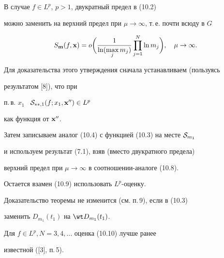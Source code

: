 \begin{note}


В случае $f\in L^p$, $p>1$, двукратный предел в (10.2)


можно заменить на верхний предел при $\mu\to\infty$, т.\,е. почти всюду в $G$


\begin{equation}


S_{{\bold m}}(f, {\bold x})=o\bigg(\frac{1}{\ln(\max\limits_j m_j)}


\prod_{j=1}^N \ln m_j\bigg),\quad \mu\to\infty.


\end{equation}


\end{note}





Для доказательства этого утверждения сначала устанавливаем (пользуясь


результатом [8]), что при


п.\,в. $x_1$ \ ${\cal S}_{**,1}(f;x_1,{\bold x}'')\in L^p$


как функция от ${\bold x}''$.


Затем записываем аналог (10.4) с функцией (10.3) на месте ${\cal S}_{m_1}$


и используем результат (7.1), взяв (вместо двукратного предела)


верхний предел при $\mu\to\infty$ в соотношении-аналоге (10.8).


Остается взамен (10.9) использовать $L^p$-оценку.








\begin{note}


Доказательство теоремы не изменится (см. п.\,9), если в (10.3)


заменить $D_{m_1}(t_1)$ на $\wt D_{m_1}(t_1)$. 


\end{note}





\begin{note}


Для $f\in L^{p}, N=3,4,\dotsc$ оценка (10.10) лучше ранее


известной ([3], п.\,5).


\end{note}






